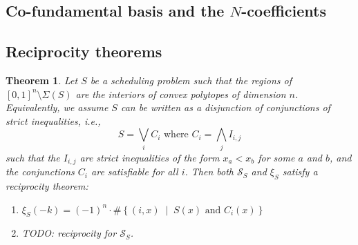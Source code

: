 \documentclass[12pt,reqno]{amsart}
\numberwithin{definition}{section}
\newtheorem{theorem}[definition]{Theorem}
\theoremstyle{definition}
\newcommand{\SSS}{\mathcal{S}}
\newcommand{\mset}[2]{ \left\{ #1 \; \middle| \; #2 \right\}}
\begin{document}
\subsection{Co-fundamental basis and the $N$-coefficients}

\subsection{Reciprocity theorems}

\begin{theorem}\label{posets}
Let $S$ be a scheduling problem such that the regions of $[0,1]^n\setminus\Sigma(S)$ are the interiors of convex polytopes of dimension $n$. Equivalently, we assume $S$ can be written as a disjunction of conjunctions of strict inequalities, i.e.,
\[
  S = \bigvee_i C_i \text{ where } C_i = \bigwedge_j I_{i,j}
\] 
such that the $I_{i,j}$ are strict inequalities of the form $x_a < x_b$ for some $a$ and $b$, and the conjunctions $C_i$ are satisfiable for all $i$. Then both $\SSS_S$ and $\xi_S$ satisfy a reciprocity theorem:
\begin{enumerate}
\item $\xi_S(-k) = (-1)^n\cdot \#\mset{(i,x)}{S(x) \text{ and } C_i(x)}$
\item TODO: reciprocity for $\SSS_S$.
\end{enumerate}
\end{theorem}


\end{document}
